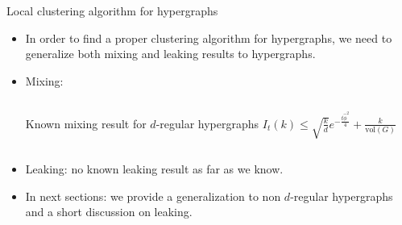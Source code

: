 \documentclass[../main.tex]{subfiles}
\begin{document}
    \begin{frame}{Local clustering algorithm for hypergraphs}
        \begin{itemize}
            \item In order to find a proper clustering algorithm for hypergraphs, we need to generalize both mixing and leaking results to hypergraphs. 
            \item Mixing:
                \begin{columns}
                    \begin{block}{Known mixing result for $d$-regular hypergraphs}
                         $I_t(k) \leq \sqrt{\frac{k}{d}} e^{-\frac{t\hat{\phi}^2}{4}} + \frac{k}{\text{vol}(G)}$   
                    \end{block}
                \end{columns}
            \item Leaking: no known leaking result as far as we know.
            \item In next sections: we provide a generalization to non $d$-regular hypergraphs and a short discussion on leaking.
        \end{itemize}
    \end{frame}
\end{document}
